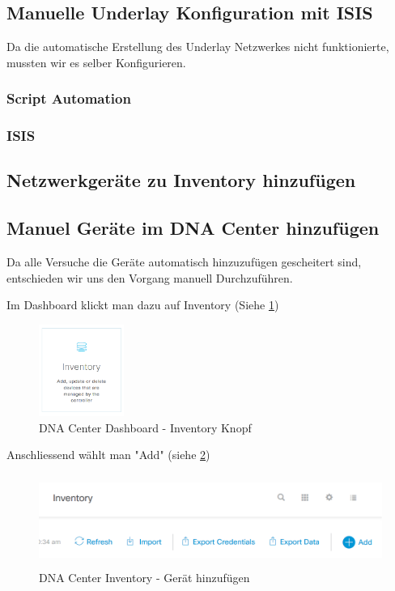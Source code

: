 \subsection{Manuelle Underlay Konfiguration mit ISIS}
Da die automatische Erstellung des Underlay Netzwerkes nicht funktionierte, mussten wir es selber Konfigurieren. 

\subsubsection{Script Automation}

\subsubsection{ISIS}

\subsection{Netzwerkgeräte zu Inventory hinzufügen}


\subsection{Manuel Geräte im DNA Center hinzufügen}
Da alle Versuche die Geräte automatisch hinzuzufügen gescheitert sind, entschieden wir uns den Vorgang manuell Durchzuführen. 

Im Dashboard klickt man dazu auf Inventory (Siehe \ref{fig:dna-center-inventory-button})

\begin{figure}[H]
	\centering
	\includegraphics[height=3cm]{img/dna-center-inventory-button.PNG}
	\caption{DNA Center Dashboard - Inventory Knopf}
	\label{fig:dna-center-inventory-button}
\end{figure}

Anschliessend wählt man "Add" (siehe \ref{fig:dna-center-inventory-add})

\begin{figure}[H]
	\centering
	\includegraphics[height=3cm]{img/dna-center-inventory-add.PNG}
	\caption{DNA Center Inventory - Gerät hinzufügen}
	\label{fig:dna-center-inventory-add}
\end{figure}

